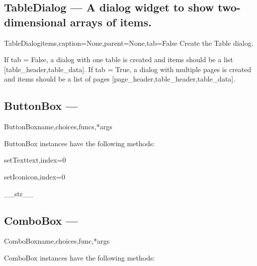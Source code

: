 \subsection{TableDialog --- A dialog widget to show two-dimensional arrays of items.}


\begin{classdesc}{TableDialog}{items,caption=None,parent=None,tab=False}
Create the Table dialog.
        
        If tab = False, a dialog with one table is created and items
        should be a list [table_header,table_data].
        If tab = True, a dialog with multiple pages is created and items
        should be a list of pages [page_header,table_header,table_data].
        
\end{classdesc}

\subsection{ButtonBox --- }


\begin{classdesc}{ButtonBox}{name,choices,funcs,*args}

\end{classdesc}

ButtonBox instances have the following methods:

\begin{funcdesc}{setText}{text,index=0}

\end{funcdesc}

\begin{funcdesc}{setIcon}{icon,index=0}

\end{funcdesc}

\begin{funcdesc}{__str__}{}

\end{funcdesc}

\subsection{ComboBox --- }


\begin{classdesc}{ComboBox}{name,choices,func,*args}

\end{classdesc}

ComboBox instances have the following methods:


